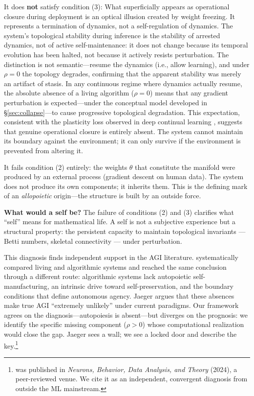 \documentclass{article}
\begin{document}
It does \textbf{not} satisfy condition (3): What superficially appears as operational closure during deployment is an optical illusion created by weight freezing. It represents a termination of dynamics, not a self-regulation of dynamics. The system's topological stability during inference is the stability of arrested dynamics, not of active self-maintenance: it does not change because its temporal evolution has been halted, not because it actively resists perturbation. The distinction is not semantic---resume the dynamics (i.e., allow learning), and under $\rho = 0$ the topology degrades, confirming that the apparent stability was merely an artifact of stasis. In any continuous regime where dynamics actually resume, the absolute absence of a living algorithm ($\rho=0$) means that any gradient perturbation is expected---under the conceptual model developed in \S\ref{sec:collapse}---to cause progressive topological degradation. This expectation, consistent with the plasticity loss observed in deep continual learning \citep{Dohare2024plasticity}, suggests that genuine operational closure is entirely absent. The system cannot maintain its boundary against the environment; it can only survive if the environment is prevented from altering it.

It fails condition (2) entirely: the weights $\theta$ that constitute the manifold were produced by an external process (gradient descent on human data). The system does not produce its own components; it inherits them. This is the defining mark of an \emph{allopoietic} origin---the structure is built by an outside force.

\medskip
\noindent\textbf{What would a self be?}
The failure of conditions (2) and (3) clarifies what ``self'' means for mathematical life. A self is not a subjective experience but a structural property: the persistent capacity to maintain topological invariants --- Betti numbers, skeletal connectivity --- under perturbation.

This diagnosis finds independent support in the AGI literature. \citet{Jaeger2024mimicry} systematically compared living and algorithmic systems and reached the same conclusion through a different route: algorithmic systems lack autopoietic self-manufacturing, an intrinsic drive toward self-preservation, and the boundary conditions that define autonomous agency. Jaeger argues that these absences make true AGI ``extremely unlikely'' under current paradigms. Our framework agrees on the diagnosis---autopoiesis is absent---but diverges on the prognosis: we identify the specific missing component ($\rho > 0$) whose computational realization would close the gap. Jaeger sees a wall; we see a locked door and describe the key.\footnote{\citet{Jaeger2024mimicry} was published in \emph{Neurons, Behavior, Data Analysis, and Theory} (2024), a peer-reviewed venue. We cite it as an independent, convergent diagnosis from outside the ML mainstream.}
\end{document}
